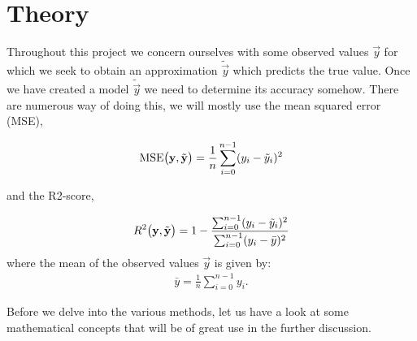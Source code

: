 \section{Theory}\label{sec:theroy}



Throughout this project we concern ourselves with some observed values $\vec{y}$ for which we seek to obtain an approximation $\tilde{\vec{y}}$ which predicts the true value. Once we have created a model $\tilde{\vec{y}}$ we need to determine its accuracy somehow. There are numerous way of doing this, we will mostly use the mean squared error (MSE),


\begin{align}\label{eq:MSE}
    \text{MSE}\big(\mathbf{y}, \tilde{\mathbf{y}}\big)= \frac{1}{n}\sum_{i=0}^{n-1} (y_i - \tilde{y}_i)^2
\end{align}

and the R2-score,

\begin{align}\label{eq:R2}
    R^2\big(\mathbf{y}, \tilde{\mathbf{y}}\big) = 1 - \frac{\sum_{i=0}^{n-1}(y_i-\tilde{y}_i)^2}{\sum_{i=0}^{n-1}(y_i-\bar{y})^2}
\end{align}
where the mean of the observed values $\vec{y}$ is given by:
\begin{align*}
    \bar{y} = \frac{1}{n}\sum_{i=0}^{n-1} y_i.
\end{align*}


Before we delve into the various methods, let us have a look at some mathematical concepts that will be of great use in the further discussion. 


